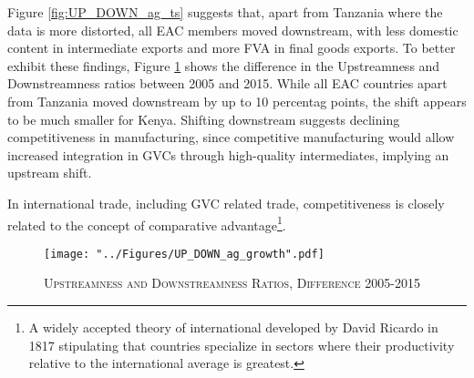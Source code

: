 \documentclass[a4paper]{article}
\begin{document}
Figure \ref{fig:UP_DOWN_ag_ts} suggests that, apart from Tanzania where the data is more distorted, all EAC members moved downstream, with less domestic content in intermediate exports and more FVA in final goods exports. To better exhibit these findings, Figure \ref{fig:UP_DOWN_ag_growth} shows the difference in the Upstreamness and Downstreamness ratios between 2005 and 2015. While all EAC countries apart from Tanzania moved downstream by up to 10 percentag points, the shift appears to be much smaller for Kenya.  %
Shifting downstream suggests declining competitiveness in manufacturing, since competitive manufacturing would allow increased integration in GVCs through high-quality intermediates, implying an upstream shift. \newline 

In international trade, including GVC related trade, competitiveness is closely related to the concept of comparative advantage\footnote{A widely accepted theory of international developed by David Ricardo in 1817 stipulating that countries specialize in sectors where their productivity relative to the international average is greatest.}. 

\begin{figure}[h!]
\centering
\caption{\label{fig:UP_DOWN_ag_growth}\textsc{Upstreamness and Downstreamness Ratios, Difference 2005-2015}}
\texttt{[image: "../Figures/UP\_DOWN\_ag\_growth".pdf]} %
\end{figure}
\FloatBarrier
\end{document}
